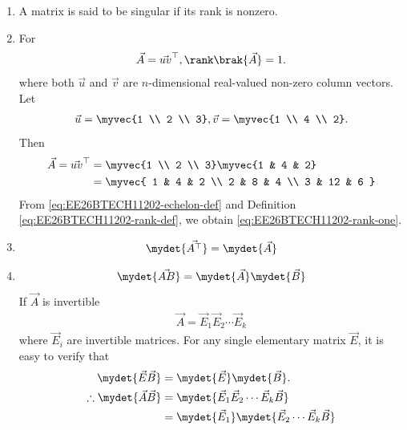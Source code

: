 \begin{enumerate}[label=\thesubsection.\arabic*, ref=\thesubsection.\theenumi]
	\label{eq:EE26BTECH11202-rank-def}
\item A matrix is said to be singular if its rank is nonzero.
	\label{eq:EE26BTECH11202-singular-def}
\item For
	\begin{align}
			\label{eq:EE26BTECH11202-rank-one}
		\vec{A} = \vec{uv}^{\top}, \rank\brak{\vec{A}} = 1.
\end{align}
	 where both $\vec{u}$ and $\vec{v}$ are $n$-dimensional real-valued non-zero column vectors. 
	 \\
	 \solution 
	 Let
\begin{align}
\vec{u} = \myvec{1 \\ 2 \\ 3}, \vec{v} = \myvec{1 \\ 4 \\ 2}.
\end{align}
Then
\begin{align}
\vec{A} = \vec{uv}^{\top} &= \myvec{1 \\ 2 \\ 3} \myvec{1 & 4 & 2} 
\\
			  &= \myvec{
1 & 4 & 2 \\
2 & 8 & 4 \\
3 & 12 & 6
}
\end{align}
	From \eqref{eq:EE26BTECH11202-echelon-def}
	and Definition
	\ref{eq:EE26BTECH11202-rank-def},
	we obtain
			\eqref{eq:EE26BTECH11202-rank-one}.
	\item 
	\begin{align}
	\mydet{\vec{A^{\top}}} = \mydet{\vec{A}} \label{eq:EE26BTECH11202-Matrices_1} 
	\end{align}
\item 
	\begin{align}
	\mydet{\vec{AB}} = \mydet{\vec{A}}\mydet{\vec{B}} 
	\end{align}
\solution
If $\vec{A}$ is invertible 
\begin{align}
\vec{A} = \vec{E}_1 \vec{E}_2 \cdots \vec{E}_k
\end{align}
where $\vec{E}_i$ are invertible matrices.
For any single elementary matrix $\vec{E}$, it is easy to verify that  
\begin{align}
	\mydet{\vec{E}\vec{B}} &= \mydet{\vec{E}}\mydet{\vec{B}}.
\\
\therefore
\mydet{\vec{A}\vec{B}} &= \mydet{\vec{E}_1 \vec{E}_2 \cdots \vec{E}_k \vec{B}} \\
&= \mydet{\vec{E}_1} \mydet{\vec{E}_2 \cdots \vec{E}_k \vec{B}} \\

\end{align}
\end{enumerate}
